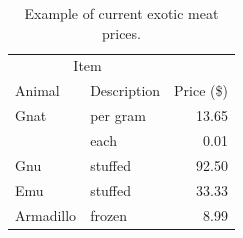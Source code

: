 \begin{table}[h]\label{tab:exotic_meat_prices}
\begin{center}\begin{tabular}{llr}
\toprule
\multicolumn{2}{c}{Item} \\
\cmidrule(r){1-2}
Animal    & Description & Price (\$) \\
\midrule
Gnat      & per gram    & 13.65      \\
          &    each     & 0.01       \\
Gnu       & stuffed     & 92.50      \\
Emu       & stuffed     & 33.33      \\
Armadillo & frozen      & 8.99       \\
\bottomrule
\end{tabular}\end{center}
\caption{Example of current exotic meat prices.}
\end{table}

\kant[14]
